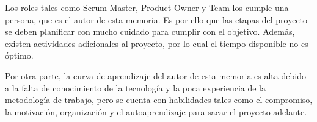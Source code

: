 Los roles tales como Scrum Master, Product Owner y Team los cumple una persona, que es el autor de esta memoria. Es por ello que las etapas del proyecto se deben planificar con mucho cuidado para cumplir con el objetivo. Además, existen actividades adicionales al proyecto, por lo cual el tiempo disponible no es óptimo.

Por otra parte, la curva de aprendizaje del autor de esta memoria es alta debido a la falta de conocimiento de la tecnología y la poca experiencia de la metodología de trabajo, pero se cuenta con habilidades tales como el compromiso, la motivación, organización y el autoaprendizaje para sacar el proyecto adelante.

